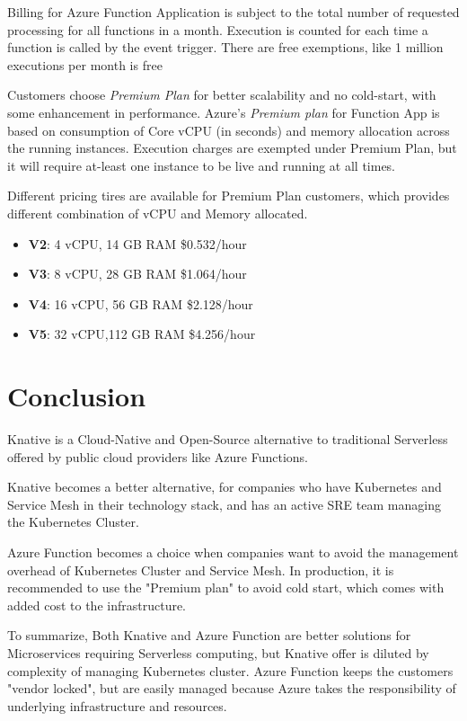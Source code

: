 \documentclass{article}
\begin{document}
\begin{flushleft}
Billing for Azure Function Application is subject to the total number of requested processing for all functions in a month. Execution is counted for each time a function is called by the event trigger. There are free exemptions, like 1 million executions per month is free
\par
Customers choose \textit{Premium Plan} for better scalability and no cold-start, with some enhancement in performance. Azure's \textit{Premium plan} for Function App is based on consumption of Core \gls{vCPU} (in seconds) and memory allocation across the running instances.
\hfill\break
Execution charges are exempted under Premium Plan, but it will require at-least one instance to be live and running at all times.
\par
Different pricing tires are available for Premium Plan customers, which provides different combination of \gls{vCPU} and Memory allocated.
\begin{itemize}
    \item \textbf{V2}: 4 \gls{vCPU},  14 GB \gls{RAM} \$0.532/hour
    \item \textbf{V3}: 8 \gls{vCPU},  28 GB \gls{RAM} \$1.064/hour
    \item \textbf{V4}: 16 \gls{vCPU}, 56 GB \gls{RAM} \$2.128/hour
    \item \textbf{V5}: 32 \gls{vCPU},112 GB \gls{RAM} \$4.256/hour
\end{itemize}
\par
\end{flushleft}
\pagebreak
\section*{Conclusion}
\begin{flushleft}
Knative is a Cloud-Native and Open-Source alternative to traditional Serverless offered by public cloud providers like Azure Functions.
\par
Knative becomes a better alternative, for companies who have Kubernetes and Service Mesh in their technology stack, and has an active \gls{SRE} team managing the Kubernetes Cluster. 
\par
Azure Function becomes a choice when companies want to avoid the management overhead of Kubernetes Cluster and Service Mesh. In production, it is recommended to use the "Premium plan" to avoid cold start, which comes with added cost to the infrastructure. 
\par
To summarize, Both Knative and Azure Function are better solutions for Microservices requiring Serverless computing, but Knative offer is diluted by complexity of managing Kubernetes cluster. Azure Function keeps the customers "vendor locked", but are easily managed because Azure takes the responsibility of underlying infrastructure and resources.

\end{flushleft}

\pagebreak

\printbibliography
\clearpage
\printglossary
\end{document}
